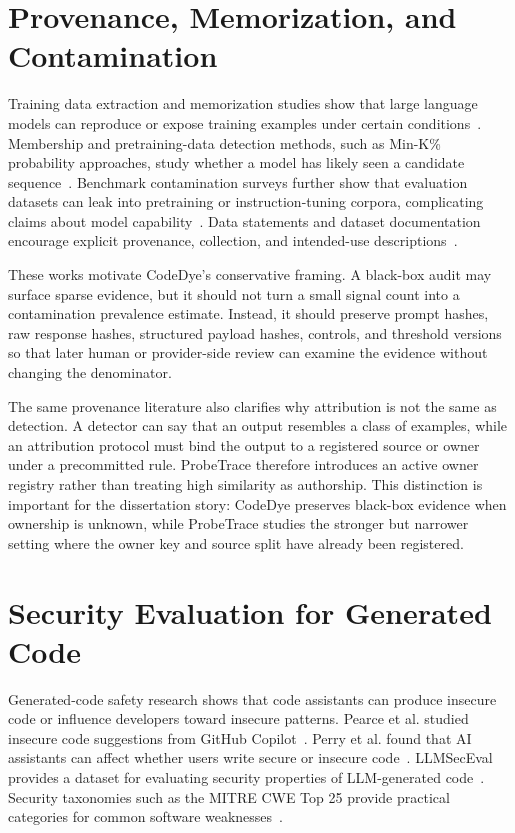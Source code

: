 \section{Provenance, Memorization, and Contamination}

Training data extraction and memorization studies show that large language models can reproduce or expose training examples under certain conditions~\cite{carlini2021extracting,carlini2023quantifying}. Membership and pretraining-data detection methods, such as Min-K\% probability approaches, study whether a model has likely seen a candidate sequence~\cite{shi2023detecting}. Benchmark contamination surveys further show that evaluation datasets can leak into pretraining or instruction-tuning corpora, complicating claims about model capability~\cite{xu2024contamination}. Data statements and dataset documentation encourage explicit provenance, collection, and intended-use descriptions~\cite{bender2018data}.

These works motivate CodeDye's conservative framing. A black-box audit may surface sparse evidence, but it should not turn a small signal count into a contamination prevalence estimate. Instead, it should preserve prompt hashes, raw response hashes, structured payload hashes, controls, and threshold versions so that later human or provider-side review can examine the evidence without changing the denominator.

The same provenance literature also clarifies why attribution is not the same as detection. A detector can say that an output resembles a class of examples, while an attribution protocol must bind the output to a registered source or owner under a precommitted rule. ProbeTrace therefore introduces an active owner registry rather than treating high similarity as authorship. This distinction is important for the dissertation story: CodeDye preserves black-box evidence when ownership is unknown, while ProbeTrace studies the stronger but narrower setting where the owner key and source split have already been registered.

\section{Security Evaluation for Generated Code}

Generated-code safety research shows that code assistants can produce insecure code or influence developers toward insecure patterns. Pearce et al. studied insecure code suggestions from GitHub Copilot~\cite{pearce2022asleep}. Perry et al. found that AI assistants can affect whether users write secure or insecure code~\cite{perry2023users}. LLMSecEval provides a dataset for evaluating security properties of LLM-generated code~\cite{siddiq2023llmseceval}. Security taxonomies such as the MITRE CWE Top 25 provide practical categories for common software weaknesses~\cite{mitre2025cwe}.

